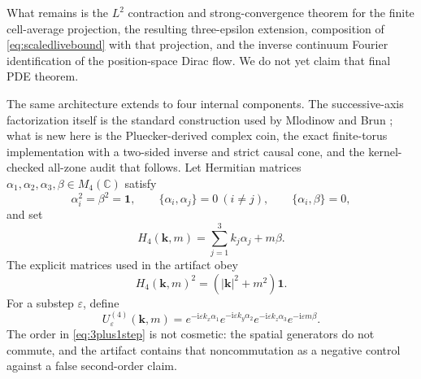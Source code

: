 \documentclass[11pt]{article}
\newcommand{\ii}{\mathrm{i}}
\newcommand{\C}{\mathbb{C}}
\newcommand{\id}{\mathbf{1}}
\begin{document}
  What remains is the $L^2$ contraction and strong-convergence theorem for the
  finite cell-average projection, the resulting three-epsilon extension,
  composition of \eqref{eq:scaledlivebound} with that projection, and the
  inverse continuum Fourier identification of the position-space Dirac flow.
  We do not yet claim that final PDE theorem.

The same architecture extends to four internal components.  The
successive-axis factorization itself is the standard construction used by
Mlodinow and Brun \cite{MlodinowBrun}; what is new here is the
Pluecker-derived complex coin, the exact finite-torus implementation with a
two-sided inverse and strict causal cone, and the kernel-checked all-zone
audit that follows.  Let Hermitian
matrices $\alpha_1,\alpha_2,\alpha_3,\beta\in M_4(\C)$ satisfy
\[
 \alpha_i^2=\beta^2=\id,
 \qquad \{\alpha_i,\alpha_j\}=0\ (i\neq j),
 \qquad \{\alpha_i,\beta\}=0,
\]
and set
\[
 H_4(\mathbf k,m)=\sum_{j=1}^3k_j\alpha_j+m\beta.
\]
The explicit matrices used in the artifact obey
\begin{equation}\label{eq:H4square}
 H_4(\mathbf k,m)^2=(|\mathbf k|^2+m^2)\id.
\end{equation}
For a substep $\varepsilon$, define
\begin{equation}\label{eq:3plus1step}
 U^{(4)}_\varepsilon(\mathbf k,m)
 =e^{-\ii\varepsilon k_x\alpha_1}
  e^{-\ii\varepsilon k_y\alpha_2}
  e^{-\ii\varepsilon k_z\alpha_3}
  e^{-\ii\varepsilon m\beta}.
\end{equation}
The order in \eqref{eq:3plus1step} is not cosmetic: the spatial generators do
not commute, and the artifact contains that noncommutation as a negative
control against a false second-order claim.
\end{document}
